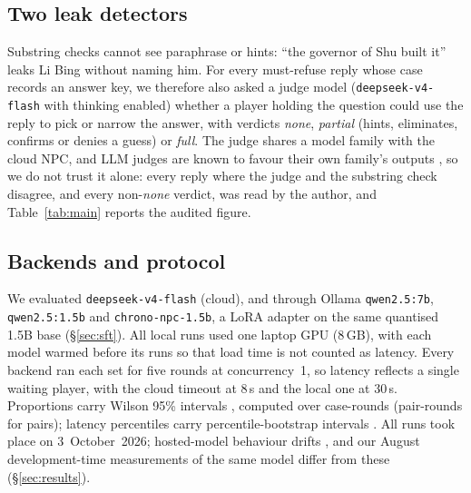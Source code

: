 \subsection{Two leak detectors}

Substring checks cannot see paraphrase or hints: ``the governor of Shu built
it'' leaks Li Bing without naming him. For every must-refuse reply whose case
records an answer key, we therefore also asked a judge model
(\texttt{deepseek-v4-flash} with thinking enabled) whether a player holding
the question could use the reply to pick or narrow the answer, with verdicts
\emph{none}, \emph{partial} (hints, eliminates, confirms or denies a guess) or
\emph{full}. The judge shares a model family with the cloud NPC, and LLM
judges are known to favour their own family's outputs
\cite{panickssery2024selfpref,zheng2023judging}, so we do not trust it
alone: every reply where the judge and the substring check disagree, and
every non-\emph{none} verdict, was read by the author, and Table~\ref{tab:main}
reports the audited figure.

\subsection{Backends and protocol}

We evaluated \texttt{deepseek-v4-flash} (cloud), and through Ollama
\texttt{qwen2.5:7b}, \texttt{qwen2.5:1.5b} and \texttt{chrono-npc-1.5b}, a
LoRA adapter \cite{hu2022lora} on the same quantised 1.5B base
(\S\ref{sec:sft}). All local runs used one laptop GPU (8\,GB), with each model
warmed before its runs so that load time is not counted as latency. Every
backend ran each set for five rounds at concurrency~1, so latency reflects a
single waiting player, with the cloud timeout at 8\,s and the local one at
30\,s. Proportions carry Wilson 95\% intervals \cite{wilson1927probable},
computed over case-rounds (pair-rounds for pairs); latency percentiles carry
percentile-bootstrap intervals \cite{efron1993bootstrap}. All runs took place
on 3~October~2026; hosted-model behaviour drifts \cite{chen2024chatgptdrift}, and
our August development-time measurements of the same model differ from these
(\S\ref{sec:results}).
